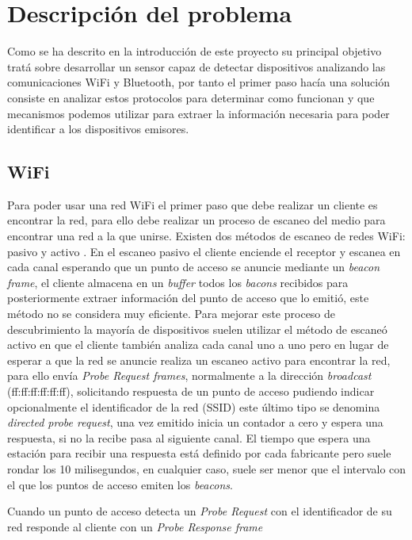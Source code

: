 \documentclass[../proyecto.tex]{subfiles}
\begin{document}
\chapter{Descripción del problema}

Como se ha descrito en la introducción de este proyecto su principal objetivo tratá sobre desarrollar un sensor capaz de detectar dispositivos analizando las comunicaciones WiFi y Bluetooth, por tanto el primer paso hacía una solución consiste en analizar estos protocolos para determinar como funcionan y que mecanismos podemos utilizar para extraer la información necesaria para poder identificar a los dispositivos emisores.

\section{WiFi}

Para poder usar una red WiFi el primer paso que debe realizar un cliente es encontrar la red, para ello debe realizar un proceso de escaneo del medio para encontrar una red a la que unirse. Existen dos métodos de escaneo de redes WiFi: pasivo y activo \cite{ieee80211_2016}. En el escaneo pasivo el cliente enciende el receptor y escanea en cada canal esperando que un punto de acceso se anuncie mediante un \textit{beacon frame}, el cliente almacena en un \textit{buffer} todos los \textit{bacons} recibidos para posteriormente extraer información del punto de acceso que lo emitió, este método no se considera muy eficiente. Para mejorar este proceso de descubrimiento la mayoría de dispositivos suelen utilizar el método de escaneó activo en que el cliente también analiza cada canal uno a uno pero en lugar de esperar a que la red se anuncie realiza un escaneo activo para encontrar la red, para ello envía \textit{Probe Request frames}, normalmente a la dirección \textit{broadcast} (ff:ff:ff:ff:ff:ff), solicitando respuesta de un punto de acceso pudiendo indicar opcionalmente el identificador de la red (SSID) este último tipo se denomina \textit{directed probe request}, una vez emitido inicia un contador a cero y espera una respuesta, si no la recibe pasa al siguiente canal. El tiempo que espera una estación para recibir una respuesta está definido por cada fabricante pero suele rondar los 10 milisegundos, en cualquier caso, suele ser menor que el intervalo con el que los puntos de acceso emiten los \textit{beacons}.

Cuando un punto de acceso detecta un \textit{Probe Request} con el identificador de su red responde al cliente con un \textit{Probe Response frame}\\
\end{document}
